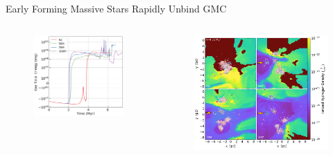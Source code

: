 \documentclass[aspectratio=169]{beamer}
\begin{document}
\begin{frame}{Early Forming Massive Stars Rapidly Unbind GMC}{}
    \begin{columns}
        \begin{column}{0.45\textwidth}
            \begin{figure}[h!]
                \centering
                \includegraphics[width=\linewidth]{../images/global_gas_total_energy_fixes.png} \\
                \label{fig:energy}
            \end{figure}
        \end{column}
        \begin{column}{0.45\textwidth}
            \begin{figure}[h!]
                \centering
                \includegraphics[width=\linewidth]{../images/ionized_H_slice.png} \\

\end{figure}
\end{column}
\end{columns}
\end{frame}
\end{document}
